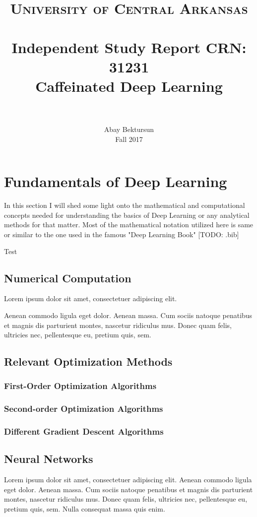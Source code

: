 \documentclass[paper=a4, fontsize=11pt]{scrartcl}
\title{
	\usefont{OT1}{bch}{b}{n}
	\normalfont \normalsize \textsc{University of Central Arkansas} \\ [25pt]
	\horrule{0.5pt} \\[0.4cm]
	\large Independent Study Report CRN: 31231 \\
	\huge Caffeinated Deep Learning \\
	\horrule{2pt} \\[0.5cm]
}
\author{
	\normalfont 			\normalsize
	Abay Bektursun\\[-3pt]	\normalsize
	Fall 2017\\[-3pt]	\normalsize
}
\date{}
\numberwithin{equation}{section}		%
\numberwithin{figure}{section}			%
\numberwithin{table}{section}			%
\begin{document}
	
	\maketitle
	\section{Fundamentals of Deep Learning}
		In this section I will shed some light onto the mathematical and computational concepts needed for understanding the basics of Deep Learning or any analytical methods for that matter. Most of the mathematical notation utilized here is same or similar to the one used in the famous "Deep Learning Book" [TODO: .bib]\par
	Test 
	
	
	\subsection{Numerical Computation}
	Lorem ipsum dolor sit amet, consectetuer adipiscing elit. 
	
	Aenean commodo ligula eget dolor. Aenean massa. Cum sociis natoque penatibus et magnis dis parturient montes, nascetur ridiculus mus. Donec quam felis, ultricies nec, pellentesque eu, pretium quis, sem.
	
	\subsection{Relevant Optimization Methods}
	\subsubsection{First-Order Optimization Algorithms}
	\subsubsection{Second-order Optimization Algorithms}
	\subsubsection{Different Gradient Descent Algorithms}
	
	\subsection{Neural Networks}
	Lorem ipsum dolor sit amet, consectetuer adipiscing elit. Aenean commodo ligula eget dolor. Aenean massa. Cum sociis natoque penatibus et magnis dis parturient montes, nascetur ridiculus mus. Donec quam felis, ultricies nec, pellentesque eu, pretium quis, sem. Nulla consequat massa quis enim. 
	
\end{document}
